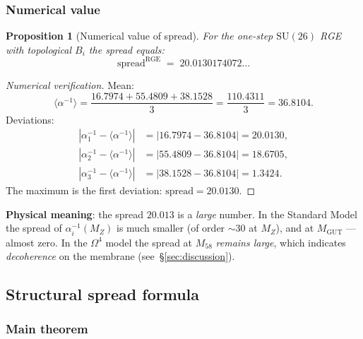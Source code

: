 \documentclass[11pt,a4paper]{article}
\newcommand{\SU}{\ensuremath{\mathrm{SU}}}
\newcommand{\Om}{\ensuremath{\Omega^4}}
\newtheorem{proposition}[theorem]{Proposition}
\theoremstyle{definition}
\begin{document}
\subsubsection{Numerical value}

\begin{proposition}[Numerical value of spread]
\label{prop:spread-numerical}
For the one-step $\SU(26)$ RGE with topological $B_i$
the spread equals:
\begin{equation}
    \boxed{
    \text{spread}^{\text{RGE}} \;=\; 20.0130174072\ldots
    }
    \label{eq:spread-rge-value}
\end{equation}
\end{proposition}

\begin{proof}[Numerical verification]
Mean:
\begin{equation}
    \langle \alpha^{-1} \rangle = \frac{16.7974 + 55.4809 + 38.1528}{3}
    = \frac{110.4311}{3} = 36.8104.
\end{equation}
Deviations:
\begin{align}
    |\alpha_1^{-1} - \langle \alpha^{-1} \rangle|
    &= |16.7974 - 36.8104| = 20.0130, \\
    |\alpha_2^{-1} - \langle \alpha^{-1} \rangle|
    &= |55.4809 - 36.8104| = 18.6705, \\
    |\alpha_3^{-1} - \langle \alpha^{-1} \rangle|
    &= |38.1528 - 36.8104| = 1.3424.
\end{align}
The maximum is the first deviation: $\text{spread} = 20.0130$.
\end{proof}

\medskip\noindent
\textbf{Physical meaning}: the spread $20.013$ is a \emph{large}
number. In the Standard Model the spread of $\alpha_i^{-1}(M_Z)$
is much smaller (of order $\sim 30$ at $M_Z$), and at $M_{\text{GUT}}$
--- almost zero. In the $\Om$ model the spread at $M_{58}$
\emph{remains large}, which indicates \emph{decoherence}
on the membrane (see~\S\ref{sec:discussion}).

\subsection{Structural spread formula}
\label{subsec:spread-formula}

\subsubsection{Main theorem}
\end{document}

